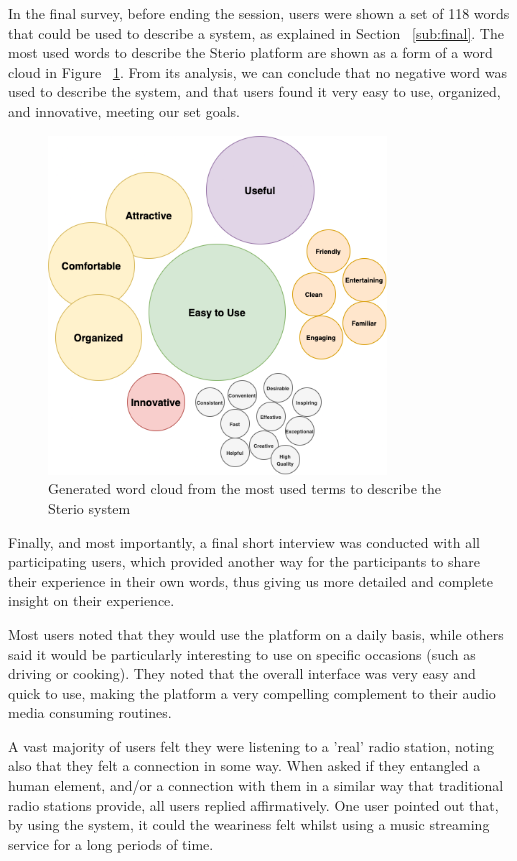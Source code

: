 {In the final survey, before ending the session, users were shown a set of 118 words that could be used to describe a system, as explained in Section ~\ref{sub:final}. The most used words to describe the Sterio platform are shown as a form of a word cloud in Figure ~\ref{fig:wordcloud}. From its analysis, we can conclude that no negative word was used to describe the system, and that users found it very easy to use, organized, and innovative, meeting our set goals.


\begin{figure}[h]
\centering
\includegraphics[width=0.8\textwidth]{./Images/wordcloud.png}
\caption{Generated word cloud from the most used terms to describe the Sterio system}
\label{fig:wordcloud}
\end{figure}

Finally, and most importantly, a final short interview was conducted with all participating users, which provided another way for the participants to share their experience in their own words, thus giving us more detailed and complete insight on their experience.

Most users noted that they would use the platform on a daily basis, while others said it would be particularly interesting to use on specific occasions (such as driving or cooking). They noted that the overall interface was very easy and quick to use, making the platform a very compelling complement to their audio media consuming routines. 

A vast majority of users felt they were listening to a 'real' radio station, noting also that they felt a connection in some way. When asked if they entangled a human element, and/or a connection with them in a similar way that traditional radio stations provide, all users replied affirmatively. One user pointed out that, by using the system, it could the weariness felt whilst using a music streaming service for a long periods of time. 

}

